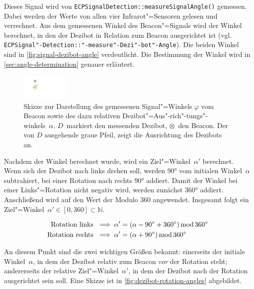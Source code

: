 Dieses Signal wird von \verb|ECPSignalDetection::measureSignalAngle()| gemessen. Dabei werden der Werte von allen vier Infrarot"=Sensoren gelesen und verrechnet. Aus dem gemessenen Winkel des Beacon"=Signals wird der Winkel berechnet, in den der Dezibot in Relation zum Beacon ausgerichtet ist (vgl. \texttt{ECPSignal"-Detection::"-measure"-Dezi"-bot"-Angle}). Die beiden Winkel sind in \autoref{fig:signal-dezibot-angle} verdeutlicht. Die Bestimmung der Winkel wird in \autoref{sec:angle-determination} genauer erläutert.

\begin{figure}[h]
    \centering
    \includegraphics[width=0.2\textwidth]{../assets/signal_dezibot_angle.pdf}
    \caption{Skizze zur Darstellung des gemessenen Signal"=Winkels $\varphi$ vom Beacon sowie des dazu relativen Dezibot"=Aus"-rich"-tungs"-winkels~$\alpha$. $D$~markiert den messenden Dezibot, $\otimes$~den Beacon. Der von $D$ ausgehende graue Pfeil, zeigt die Ausrichtung des Dezibots an.}
    \label{fig:signal-dezibot-angle}
\end{figure}

Nachdem der Winkel berechnet wurde, wird ein Ziel"=Winkel~$\alpha'$ berechnet. Wenn sich der Dezibot nach links drehen soll, werden 90° vom initialen Winkel~$\alpha$ subtrahiert, bei einer Rotation nach rechts 90° addiert. Damit der Winkel bei einer Links"=Rotation nicht negativ wird, werden zunächst 360° addiert. Anschließend wird auf den Wert der Modulo 360 angewendet. Insgesamt folgt ein Ziel"=Winkel~$\alpha' \in [0,360] \subset \mathbb{N}$.

\begin{equation*}
\begin{aligned}
    \text{Rotation links } &\implies \alpha' = (\alpha - 90^\circ + 360^\circ) \operatorname{mod} 360^\circ \\
    \text{Rotation rechts } &\implies \alpha' = (\alpha + 90^\circ) \operatorname{mod} 360^\circ
\end{aligned}
\end{equation*}

An diesem Punkt sind die zwei wichtigen Größen bekannt: einerseits der initiale Winkel~$\alpha$, in dem der Dezibot relativ zum Beacon \emph{vor} der Rotation steht; andererseits der relative Ziel"=Winkel~$\alpha'$, in dem der Dezibot nach der Rotation ausgerichtet sein soll. Eine Skizze ist in \autoref{fig:dezibot-rotation-angles} abgebildet.

